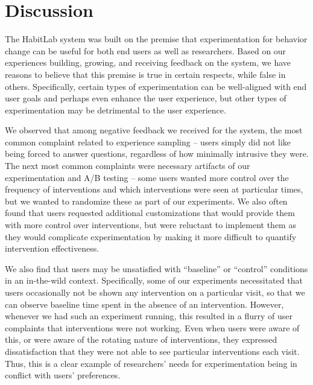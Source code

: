 \section{Discussion}


The HabitLab system was built on the premise that experimentation for behavior change can be useful for both end users as well as researchers. Based on our experiences building, growing, and receiving feedback on the system, we have reasons to believe that this premise is true in certain respects, while false in others. Specifically, certain types of experimentation can be well-aligned with end user goals and perhaps even enhance the user experience, but other types of experimentation may be detrimental to the user experience.

We observed that among negative feedback we received for the system, the most common complaint related to experience sampling -- users simply did not like being forced to answer questions, regardless of how minimally intrusive they were. The next most common complaints were necessary artifacts of our experimentation and A/B testing -- some users wanted more control over the frequency of interventions and which interventions were seen at particular times, but we wanted to randomize these as part of our experiments. We also often found that users requested additional customizations that would provide them with more control over interventions, but were reluctant to implement them as they would complicate experimentation by making it more difficult to quantify intervention effectiveness.

We also find that users may be unsatisfied with ``baseline'' or ``control'' conditions in an in-the-wild context. Specifically, some of our experiments necessitated that users occasionally not be shown any intervention on a particular visit, so that we can observe baseline time spent in the absence of an intervention. However, whenever we had such an experiment running, this resulted in a flurry of user complaints that interventions were not working. Even when users were aware of this, or were aware of the rotating nature of interventions, they expressed dissatisfaction that they were not able to see particular interventions each visit. Thus, this is a clear example of researchers' needs for experimentation being in conflict with users' preferences.

